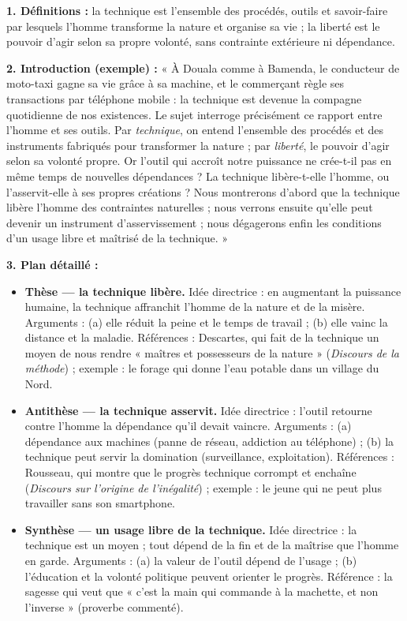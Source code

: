 \documentclass[11pt]{article}
\newcommand{\cle}[1]{{\popxbold\color{popdark}#1}}
\begin{document}
\begin{corrige}
\textbf{1. Définitions :} la \cle{technique} est l'ensemble des procédés, outils et savoir-faire par lesquels l'homme transforme la nature et organise sa vie ; la \cle{liberté} est le pouvoir d'agir selon sa propre volonté, sans contrainte extérieure ni dépendance.

\textbf{2. Introduction (exemple) :} « À Douala comme à Bamenda, le conducteur de moto-taxi gagne sa vie grâce à sa machine, et le commerçant règle ses transactions par téléphone mobile : la technique est devenue la compagne quotidienne de nos existences. Le sujet interroge précisément ce rapport entre l'homme et ses outils. Par \emph{technique}, on entend l'ensemble des procédés et des instruments fabriqués pour transformer la nature ; par \emph{liberté}, le pouvoir d'agir selon sa volonté propre. Or l'outil qui accroît notre puissance ne crée-t-il pas en même temps de nouvelles dépendances ? La technique libère-t-elle l'homme, ou l'asservit-elle à ses propres créations ? Nous montrerons d'abord que la technique libère l'homme des contraintes naturelles ; nous verrons ensuite qu'elle peut devenir un instrument d'asservissement ; nous dégagerons enfin les conditions d'un usage libre et maîtrisé de la technique. »

\textbf{3. Plan détaillé :}
\begin{itemize}
\item \textbf{Thèse — la technique libère.} Idée directrice : en augmentant la puissance humaine, la technique affranchit l'homme de la nature et de la misère. Arguments : (a) elle réduit la peine et le temps de travail ; (b) elle vainc la distance et la maladie. Références : Descartes, qui fait de la technique un moyen de nous rendre « maîtres et possesseurs de la nature » (\emph{Discours de la méthode}) ; exemple : le forage qui donne l'eau potable dans un village du Nord.
\item \textbf{Antithèse — la technique asservit.} Idée directrice : l'outil retourne contre l'homme la dépendance qu'il devait vaincre. Arguments : (a) dépendance aux machines (panne de réseau, addiction au téléphone) ; (b) la technique peut servir la domination (surveillance, exploitation). Références : Rousseau, qui montre que le progrès technique corrompt et enchaîne (\emph{Discours sur l'origine de l'inégalité}) ; exemple : le jeune qui ne peut plus travailler sans son smartphone.
\item \textbf{Synthèse — un usage libre de la technique.} Idée directrice : la technique est un moyen ; tout dépend de la fin et de la maîtrise que l'homme en garde. Arguments : (a) la valeur de l'outil dépend de l'usage ; (b) l'éducation et la volonté politique peuvent orienter le progrès. Référence : la sagesse qui veut que « c'est la main qui commande à la machette, et non l'inverse » (proverbe commenté).
\end{itemize}


\end{corrige}
\end{document}
